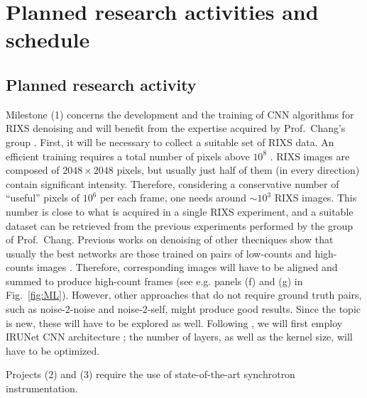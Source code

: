 \documentclass[a4paper, 12pt]{article}
\begin{document}
\section{Planned research activities and schedule}

\subsection{Planned research activity}
Milestone (1) concerns the development and the training of CNN algorithms for RIXS denoising and will benefit from the expertise acquired by Prof.~Chang’s group \cite{oppliger2022weak}. First, it will be necessary to collect a suitable set of RIXS data. An efficient training requires a total number of pixels above $10^8$ \cite{oppliger2022weak}. RIXS images are composed of $2048\times2048$ pixels, but usually just half of them (in every direction) contain significant intensity. Therefore, considering a conservative number of ``useful'' pixels of $10^6$ per each frame, one needs around $\sim10^3$ RIXS images. This number is close to what is acquired in a single RIXS experiment, and a suitable dataset can be retrieved from the previous experiments performed by the group of Prof.~Chang. Previous works on denoising of other thecniques show that usually the best networks are those trained on pairs of low-counts and high-counts images \cite{oppliger2022weak}. 
Therefore, corresponding images will have to be aligned and summed to produce high-count frames (see e.g. panels (f) and (g) in Fig.~\ref{fig:ML}). 
However, other approaches that do not require ground truth pairs, such as noise-2-noise and noise-2-self, might produce good results. Since the topic is new, these will have to be explored as well.
Following \cite{oppliger2022weak}, we will first employ IRUNet CNN architecture \cite{irunet}; the number of layers, as well as the kernel size, will have to be optimized. 

\medskip

Projects (2) and (3) require the use of state-of-the-art synchrotron instrumentation.
\end{document}
